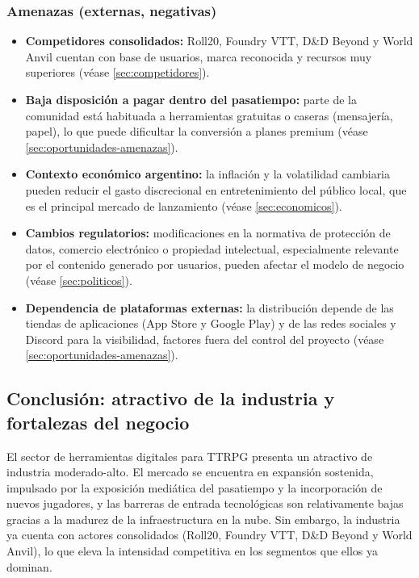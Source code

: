 \subsubsection{Amenazas (externas, negativas)}
\begin{itemize}
  \item \textbf{Competidores consolidados:} Roll20, Foundry VTT, D\&D Beyond y World Anvil cuentan con base de usuarios, marca reconocida y recursos muy superiores (véase \ref{sec:competidores}).
  \item \textbf{Baja disposición a pagar dentro del pasatiempo:} parte de la comunidad está habituada a herramientas gratuitas o caseras (mensajería, papel), lo que puede dificultar la conversión a planes premium (véase \ref{sec:oportunidades-amenazas}).
  \item \textbf{Contexto económico argentino:} la inflación y la volatilidad cambiaria pueden reducir el gasto discrecional en entretenimiento del público local, que es el principal mercado de lanzamiento (véase \ref{sec:economicos}).
  \item \textbf{Cambios regulatorios:} modificaciones en la normativa de protección de datos, comercio electrónico o propiedad intelectual, especialmente relevante por el contenido generado por usuarios, pueden afectar el modelo de negocio (véase \ref{sec:politicos}).
  \item \textbf{Dependencia de plataformas externas:} la distribución depende de las tiendas de aplicaciones (App Store y Google Play) y de las redes sociales y Discord para la visibilidad, factores fuera del control del proyecto (véase \ref{sec:oportunidades-amenazas}).
\end{itemize}

\subsection{Conclusión: atractivo de la industria y fortalezas del negocio}
El sector de herramientas digitales para TTRPG presenta un atractivo de industria moderado-alto. El mercado se encuentra en expansión sostenida, impulsado por la exposición mediática del pasatiempo y la incorporación de nuevos jugadores, y las barreras de entrada tecnológicas son relativamente bajas gracias a la madurez de la infraestructura en la nube. Sin embargo, la industria ya cuenta con actores consolidados (Roll20, Foundry VTT, D\&D Beyond y World Anvil), lo que eleva la intensidad competitiva en los segmentos que ellos ya dominan.

